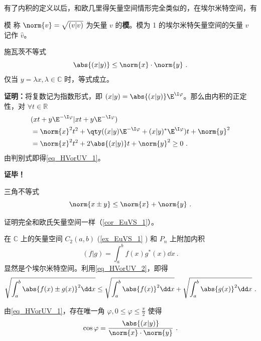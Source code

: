 有了内积的定义以后，和欧几里得矢量空间情形完全类似的，在埃尔米特空间，有
\begin{definition}{模}
称 $\norm{  v}=\sqrt{(  v|  v)}$ 为矢量 $  v$ 的\textbf{模}。模为 1 的埃尔米特矢量空间的矢量 $v$ 记作 $\hat{v}$。
\end{definition} 
\begin{theorem}{施瓦茨不等式}
\begin{equation}\label{eq_HVorUV_1}
\abs{(  x|  y)}\leq \norm{  x}\cdot \norm{  y}~.
\end{equation}
仅当 $  y=\lambda  x,\lambda\in\mathbb{C}$ 时，等式成立。
\end{theorem}
\textbf{证明：}将复数记为指数形式，即 $(  x|  y)=\abs{(  x|  y)}\E^{\I \varphi}$。那么由内积的正定性，对 $\forall t\in\mathbb{R}$
\begin{equation}
\begin{aligned}
&(  x t+  y\E^{-\I\varphi}|  x t+  y\E^{-\I\varphi})\\
&=\norm{  x}^2t^2+\qty((  x|  y)\E^{-\I\varphi}+(  x|  y)^*\E^{\I\varphi})t+\norm{  y}^2\\
&=\norm{  x}^2t^2+2\abs{(  x|  y)}t+\norm{  y}^2\geq0~.
\end{aligned}
\end{equation}
由判别式即得\autoref{eq_HVorUV_1}。

\textbf{证毕！}
\begin{corollary}{三角不等式}
\begin{equation}\label{eq_HVorUV_2}
\norm{  x\pm  y}\leq\norm{  x}+\norm{  y}~.
\end{equation}
\end{corollary}
证明完全和欧氏矢量空间一样（\autoref{cor_EuVS_1}）。
\begin{example}{}\label{ex_HVorUV_1}
在 $\mathbb{C}$ 上的矢量空间 $C_2(a,b)$ (\autoref{ex_EuVS_1} ) 和 $P_n$ 上附加内积
\begin{equation}
(f|g)=\int_a^{b}f(x)g^*(x)\dd x~.
\end{equation}
显然是个埃尔米特空间。利用\autoref{eq_HVorUV_2}，即得
\begin{equation}
\sqrt{\int_a^b\abs{f(x)\pm g(x)}^2\dd x}\leq\sqrt{\int_a^b\abs{f(x)}^2\dd x}+\sqrt{\int_a^b\abs{g(x)}^2\dd x}~.
\end{equation}
\end{example}
由\autoref{eq_HVorUV_1}，存在唯一角 $\varphi,0\leq\varphi\leq\frac{\pi}{2}$ 使得
\begin{equation}
\cos\varphi=\frac{\abs{(  x|  y)}}{\norm{  x}\cdot \norm{  y}}~.
\end{equation}
